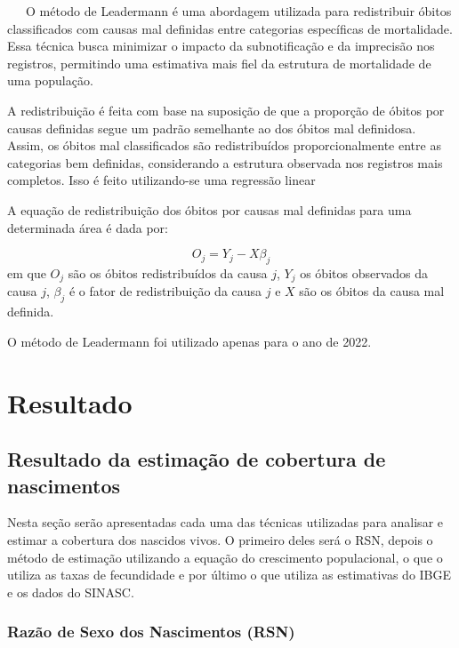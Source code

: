 \documentclass[
  12pt,
  a4paper,
]{scrreprt}
\begin{document}
~~~O método de Leadermann é uma abordagem utilizada para redistribuir
óbitos classificados com causas mal definidas entre categorias
específicas de mortalidade. Essa técnica busca minimizar o impacto da
subnotificação e da imprecisão nos registros, permitindo uma estimativa
mais fiel da estrutura de mortalidade de uma população.

\vspace{12pt}

A redistribuição é feita com base na suposição de que a proporção de
óbitos por causas definidas segue um padrão semelhante ao dos óbitos mal
definidosa. Assim, os óbitos mal classificados são redistribuídos
proporcionalmente entre as categorias bem definidas, considerando a
estrutura observada nos registros mais completos. Isso é feito
utilizando-se uma regressão linear

\vspace{12pt}

A equação de redistribuição dos óbitos por causas mal definidas para uma
determinada área é dada por:

\[
O_j = Y_j - X \beta_{j}
\] em que \(O_j\) são os óbitos redistribuídos da causa \(j\), \(Y_j\)
os óbitos observados da causa \(j\), \(\beta_j\) é o fator de
redistribuição da causa \(j\) e \(X\) são os óbitos da causa mal
definida.

\vspace{12pt}

O método de Leadermann foi utilizado apenas para o ano de 2022.

\chapter{Resultado}\label{resultado}

\section{Resultado da estimação de cobertura de
nascimentos}\label{resultado-da-estimauxe7uxe3o-de-cobertura-de-nascimentos}

Nesta seção serão apresentadas cada uma das técnicas utilizadas para
analisar e estimar a cobertura dos nascidos vivos. O primeiro deles será
o RSN, depois o método de estimação utilizando a equação do crescimento
populacional, o que o utiliza as taxas de fecundidade e por último o que
utiliza as estimativas do IBGE e os dados do SINASC.

\subsection{Razão de Sexo dos Nascimentos
(RSN)}\label{razuxe3o-de-sexo-dos-nascimentos-rsn-1}
\end{document}
